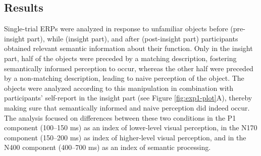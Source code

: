 \documentclass[
  english,
  doc,12pt,twoside,floatsintext]{apa7}
\begin{document}
\hypertarget{results}{%
\subsection{Results}\label{results}}

Single-trial ERPs were analyzed in response to unfamiliar objects before (pre-insight part), while (insight part), and after (post-insight part) participants obtained relevant semantic information about their function. Only in the insight part, half of the objects were preceded by a matching description, fostering semantically informed perception to occur, whereas the other half were preceded by a non-matching description, leading to naive perception of the object. The objects were analyzed according to this manipulation in combination with participants' self-report in the insight part (see Figure \ref{fig:exp1-plot}A), thereby making sure that semantically informed and naive perception did indeed occur. The analysis focused on differences between these two conditions in the P1 component (100--150 ms) as an index of lower-level visual perception, in the N170 component (150--200 ms) as index of higher-level visual perception, and in the N400 component (400--700 ms) as an index of semantic processing.
\end{document}
